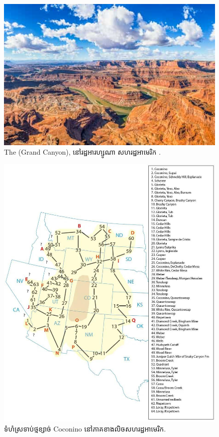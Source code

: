 \documentclass[10pt,twocolumn,letterpaper]{article}
\begin{document}
\begin{figure}[b]
\begin{center}
   \includegraphics[width=1\linewidth]{grand-canyon.jpg}

\end{center}
   \caption{The (Grand Canyon), នៅរដ្ឋអារហ្សូណា សហរដ្ឋអាមេរិក \cite{49}.}
\label{fig:2}
\label{fig:onecol}
\end{figure}

\begin{figure}[t]
\begin{center}
   \includegraphics[width=1\linewidth]{coconino.jpg}
\end{center}
   \caption{ទំហំស្រទាប់ថ្មខ្សាច់ Coconino នៅភាគខាងលិចសហរដ្ឋអាមេរិក\cite{21}.}
\label{fig:3}
\label{fig:onecol}
\end{figure}
\end{document}
